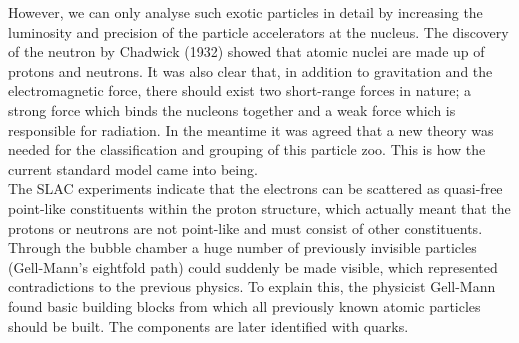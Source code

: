 However, we can only analyse such exotic particles in detail by increasing the luminosity and precision of the particle accelerators at the nucleus. 
The discovery of the neutron by Chadwick (1932) showed that atomic nuclei are made up of protons and neutrons. It was also clear that, in addition to gravitation and the electromagnetic force, there should exist two short-range forces in nature; a strong force which binds the nucleons together and a weak force which is responsible for radiation.
In the meantime it was agreed that a new theory was needed for the classification and grouping of this particle zoo. This is how the current standard model came into being.\\
The SLAC experiments indicate that the electrons can be scattered as quasi-free point-like constituents within the proton structure, which actually meant that the protons or neutrons are not point-like and must consist of other constituents. Through the bubble chamber a huge number of previously invisible particles (Gell-Mann's eightfold path) could suddenly be made visible, which represented contradictions to the previous physics. To explain this, the physicist Gell-Mann found basic building blocks from which all previously known atomic particles should be built. The components are later identified with quarks.\\
\newpage
